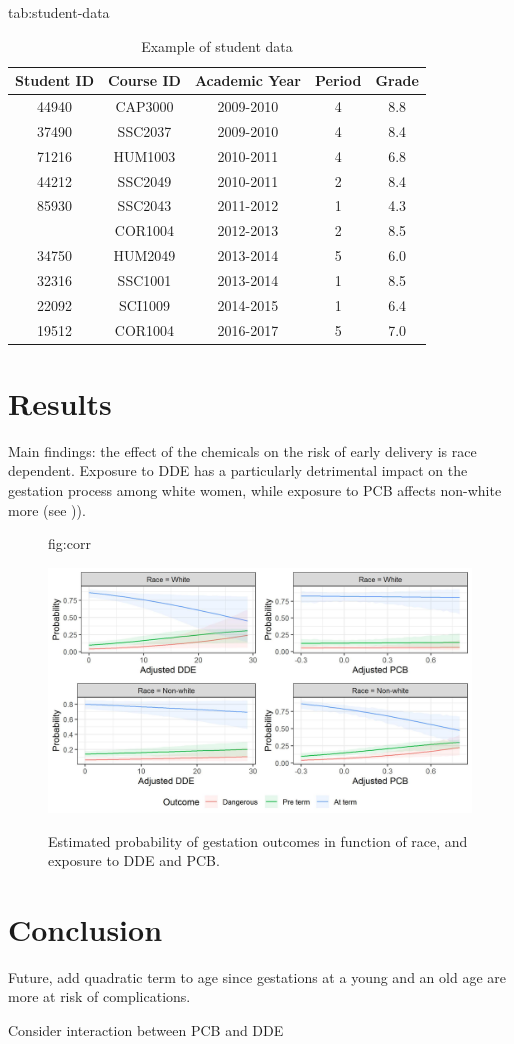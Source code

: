 \documentclass[wcp]{jmlr}%
\begin{document}
\begin{table}[hbtp]
	\floatconts
	{tab:student-data}
	{\caption{Example of student data}}	
	{\begin{tabular}{ccccc}
		\toprule
		\bfseries Student ID &\bfseries Course ID &\bfseries Academic Year &\bfseries Period &\bfseries Grade\\
		\midrule
		44940 & CAP3000 & 2009-2010 & 4 & 8.8\\
		37490 & SSC2037 & 2009-2010 & 4 & 8.4\\
		71216 & HUM1003 & 2010-2011 & 4 & 6.8\\
		44212 & SSC2049 & 2010-2011 & 2 & 8.4\\
		85930 & SSC2043 & 2011-2012 & 1 & 4.3\\
		\addlinespace
		14492 & COR1004 & 2012-2013 & 2 & 8.5\\
		34750 & HUM2049 & 2013-2014 & 5 & 6.0\\
		32316 & SSC1001 & 2013-2014 & 1 & 8.5\\
		22092 & SCI1009 & 2014-2015 & 1 & 6.4\\
		19512 & COR1004 & 2016-2017 & 5 & 7.0\\
		\bottomrule
	\end{tabular}}	
\end{table}


\section{Results}
\label{sec:results}

Main findings: the effect of the chemicals on the risk of early delivery is race dependent. Exposure to DDE has a particularly detrimental impact on the gestation process among white women, while exposure to PCB affects non-white more (see )).


\begin{figure}[htbp]
	\floatconts
	{fig:corr}
	{\caption{Estimated probability of gestation outcomes in function of race, and exposure to DDE and PCB.}}
	{\includegraphics[width=0.8\linewidth]{results}}
\end{figure}



\section{Conclusion}
\label{sec:conclusion}

Future, add quadratic term to age since gestations at a young and an old age are more at risk of complications.

Consider interaction between PCB and DDE

%
\end{document}
